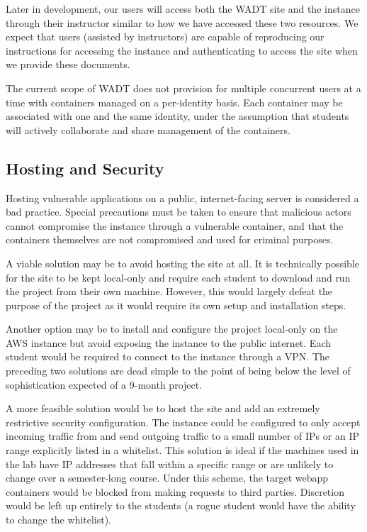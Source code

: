 \documentclass[12pt]{article}
\begin{document}
Later in development, our users will access both the WADT site and the instance through their instructor similar to how we have accessed these two resources. We expect that users (assisted by instructors) are capable of reproducing our instructions for accessing the instance and authenticating to access the site when we provide these documents.

The current scope of WADT does not provision for multiple concurrent users at a time with containers managed on a per-identity basis. Each container may be associated with one and the same identity, under the assumption that students will actively collaborate and share management of the containers.

\subsection{Hosting and Security}
Hosting vulnerable applications on a public, internet-facing server is considered a bad practice. Special precautions must be taken to ensure that malicious actors cannot compromise the instance through a vulnerable container, and that the containers themselves are not compromised and used for criminal purposes.

A viable solution may be to avoid hosting the site at all. It is technically possible for the site to be kept local-only and require each student to download and run the project from their own machine. However, this would largely defeat the purpose of the project as it would require its own setup and installation steps.

Another option may be to install and configure the project local-only on the AWS instance but avoid exposing the instance to the public internet. Each student would be required to connect to the instance through a VPN. The preceding two solutions are dead simple to the point of being below the level of sophistication expected of a 9-month project.

A more feasible solution would be to host the site and add an extremely restrictive security configuration. The instance could be configured to only accept incoming traffic from and send outgoing traffic to a small number of IPs or an IP range explicitly listed in a whitelist. This solution is ideal if the machines used in the lab have IP addresses that fall within a specific range or are unlikely to change over a semester-long course. Under this scheme, the target webapp containers would be blocked from making requests to third parties. Discretion would be left up entirely to the students (a rogue student would have the ability to change the whitelist).
\end{document}
